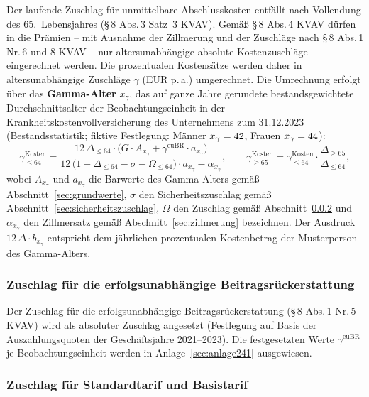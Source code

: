 Der laufende Zuschlag für unmittelbare Abschlusskosten entfällt nach
Vollendung des 65.~Lebensjahres (\S\,8 Abs.\,3 Satz~3 KVAV).
Gemäß \S\,8 Abs.\,4 KVAV dürfen in die Prämien -- mit Ausnahme der
Zillmerung und der Zuschläge nach \S\,8 Abs.\,1 Nr.\,6 und 8 KVAV --
nur altersunabhängige absolute Kostenzuschläge eingerechnet werden.
Die prozentualen Kostensätze werden daher in altersunabhängige
Zuschläge $\gamma$ (EUR p.\,a.) umgerechnet. Die Umrechnung erfolgt
über das \textbf{Gamma-Alter} $x_\gamma$, das auf ganze Jahre
gerundete bestandsgewichtete Durchschnittsalter der
Beobachtungseinheit in der Krankheitskostenvollversicherung des
Unternehmens zum 31.12.2023 (Bestandsstatistik; fiktive Festlegung:
Männer $x_\gamma = 42$, Frauen $x_\gamma = 44$):
\begin{equation}
\gamma^{\mathrm{Kosten}}_{\le 64}
= \frac{12\,\Delta_{\le 64}\cdot\bigl(G\cdot A_{x_\gamma}
  + \gamma^{\mathrm{euBR}}\cdot a_{x_\gamma}\bigr)}
       {12\,\bigl(1-\Delta_{\le 64}-\sigma-\Omega_{\le 64}\bigr)\cdot
        a_{x_\gamma} - \alpha_{x_\gamma}},
\qquad
\gamma^{\mathrm{Kosten}}_{\ge 65}
= \gamma^{\mathrm{Kosten}}_{\le 64}\cdot
  \frac{\Delta_{\ge 65}}{\Delta_{\le 64}},
\label{eq:gammakosten}
\end{equation}
wobei $A_{x_\gamma}$ und $a_{x_\gamma}$ die Barwerte des Gamma-Alters
gemäß Abschnitt~\ref{sec:grundwerte}, $\sigma$ den Sicherheitszuschlag
gemäß Abschnitt~\ref{sec:sicherheitszuschlag},
$\Omega$ den Zuschlag gemäß Abschnitt~\ref{sec:omega} und
$\alpha_{x_\gamma}$ den Zillmersatz gemäß
Abschnitt~\ref{sec:zillmerung} bezeichnen. Der Ausdruck
$12\,\Delta\cdot b_{x_\gamma}$ entspricht dem jährlichen prozentualen
Kostenbetrag der Musterperson des Gamma-Alters.

\subsubsection{Zuschlag für die erfolgsunabhängige
Beitragsrückerstattung}\label{sec:eubr}

Der Zuschlag für die erfolgsunabhängige Beitragsrückerstattung
(\S\,8 Abs.\,1 Nr.\,5 KVAV) wird als absoluter Zuschlag angesetzt
(Festlegung auf Basis der Auszahlungsquoten der Geschäftsjahre
2021--2023). Die festgesetzten Werte $\gamma^{\mathrm{euBR}}$ je
Beobachtungseinheit werden in Anlage~\ref{sec:anlage241}
ausgewiesen.

\subsubsection{Zuschlag für Standardtarif und Basistarif}
\label{sec:omega}

